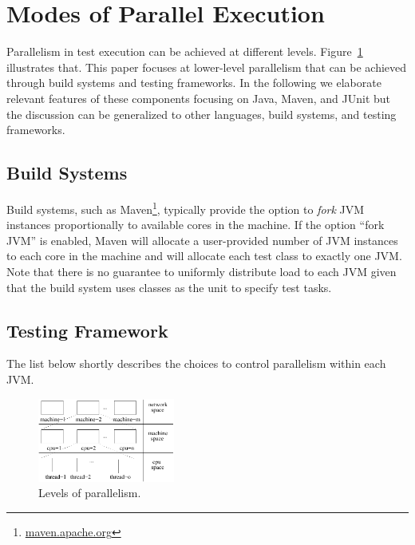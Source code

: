 \section{Modes of Parallel Execution}

Parallelism in test execution can be achieved at different levels.
Figure~\ref{fig:levels} illustrates that.  This paper focuses
at lower-level parallelism that can be achieved through build systems
and testing frameworks.  In the following we elaborate relevant
features of these components focusing on Java, Maven, and JUnit but
the discussion can be generalized to other languages, build systems,
and testing frameworks.

\subsection{Build Systems}
Build systems, such as Maven\footnote{\url{maven.apache.org}},
typically provide the option to \emph{fork} JVM instances
proportionally to available cores in the machine.  If the option
``fork JVM'' is enabled, Maven will allocate a user-provided number of
JVM instances to each core in the machine and will allocate each test
class to exactly one JVM.  Note that there is no guarantee to
uniformly distribute load to each JVM given that the build system uses
classes as the unit to specify test tasks.

\subsection{Testing Framework}

The list below shortly describes the choices to control parallelism
within each JVM.

\begin{figure}[t!]
  \centering
  \includegraphics[width=0.4\textwidth]{figs/parallel-levels.pdf}
  \caption{\label{fig:levels}Levels of parallelism.}
\end{figure}

\newcommand{\Seq}{L0}
\newcommand{\ParClassSeqMeth}{L1}
\newcommand{\SeqClassParMeth}{L2}
\newcommand{\ParClassParMeth}{L3}


